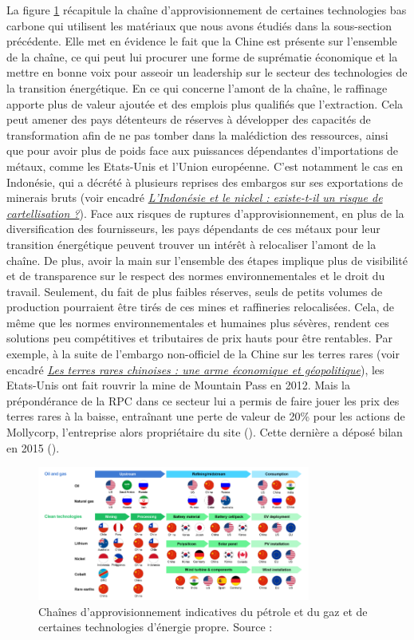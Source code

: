 La figure \ref{fig:supply} récapitule la chaîne d'approvisionnement de certaines technologies bas carbone qui utilisent les matériaux que nous avons étudiés dans la sous-section précédente. Elle met en évidence le fait que la Chine est présente sur l'ensemble de la chaîne, ce qui peut lui procurer une forme de suprématie économique et la mettre en bonne voix pour asseoir un leadership sur le secteur des technologies de la transition énergétique. 
\smallbreak
En ce qui concerne l'amont de la chaîne, le raffinage apporte plus de valeur ajoutée et des emplois plus qualifiés que l'extraction. Cela peut amener des pays détenteurs de réserves à développer des capacités de transformation afin de ne pas tomber dans la malédiction des ressources, ainsi que pour avoir plus de poids face aux puissances dépendantes d'importations de métaux, comme les Etats-Unis et l'Union européenne. C'est notamment le cas en Indonésie, qui a décrété à plusieurs reprises des embargos sur ses exportations de minerais bruts (voir encadré \hyperref[Indonesia]{\textit{L'Indonésie et le nickel : existe-t-il un risque de cartellisation ?}}).
\smallbreak
Face aux risques de ruptures d'approvisionnement, en plus de la diversification des fournisseurs, les pays dépendants de ces métaux pour leur transition énergétique peuvent trouver un intérêt à relocaliser l'amont de la chaîne. De plus, avoir la main sur l'ensemble des étapes implique plus de visibilité et de transparence sur le respect des normes environnementales et le droit du travail. Seulement, du fait de plus faibles réserves, seuls de petits volumes de production pourraient être tirés de ces mines et raffineries relocalisées. Cela, de même que les normes environnementales et humaines plus sévères, rendent ces solutions peu compétitives et tributaires de prix hauts pour être rentables. Par exemple, à la suite de l'embargo non-officiel de la Chine sur les terres rares (voir encadré \hyperref[Chine]{\textit{Les terres rares chinoises : une arme économique et géopolitique}}), les Etats-Unis ont fait rouvrir la mine de Mountain Pass en 2012. Mais la prépondérance de la RPC dans ce secteur lui a permis de faire jouer les prix des terres rares à la baisse, entraînant une perte de valeur de 20\% pour les actions de Mollycorp, l'entreprise alors propriétaire du site (\cite{niquet_chine_2011}). Cette dernière a déposé bilan en 2015 (\cite{hsu_molycorp_2015}).

\begin{figure}[!b]
    \centering
    \includegraphics[width=0.8\textwidth]{Images/02 appro/SC metaux.png}
    \caption{Chaînes d'approvisionnement indicatives du pétrole et du gaz et de certaines technologies d'énergie propre. Source : \cite{iea_role_2021}}
    \label{fig:supply}
\end{figure}

